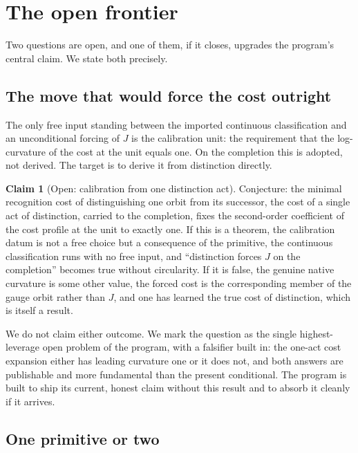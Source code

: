 \documentclass[11pt,a4paper]{article}
\theoremstyle{definition}
\newtheorem{claim}[theorem]{Claim}
\theoremstyle{remark}
\begin{document}
\section{The open frontier}\label{sec:frontier}

Two questions are open, and one of them, if it closes, upgrades the program's
central claim. We state both precisely.

\subsection{The move that would force the cost outright}

The only free input standing between the imported continuous classification and an
unconditional forcing of $J$ is the calibration unit: the requirement that the
log-curvature of the cost at the unit equals one. On the completion this is
adopted, not derived. The target is to derive it from distinction directly.

\begin{claim}[Open: calibration from one distinction act]\label{cl:move1}
Conjecture: the minimal recognition cost of distinguishing one orbit from its
successor, the cost of a single act of distinction, carried to the completion,
fixes the second-order coefficient of the cost profile at the unit to exactly one.
If this is a theorem, the calibration datum is not a free choice but a consequence
of the primitive, the continuous classification runs with no free input, and
``distinction forces $J$ on the completion'' becomes true without circularity. If
it is false, the genuine native curvature is some other value, the forced cost is
the corresponding member of the gauge orbit rather than $J$, and one has learned
the true cost of distinction, which is itself a result.
\end{claim}

We do not claim either outcome. We mark the question as the single
highest-leverage open problem of the program, with a falsifier built in: the
one-act cost expansion either has leading curvature one or it does not, and both
answers are publishable and more fundamental than the present conditional. The
program is built to ship its current, honest claim without this result and to
absorb it cleanly if it arrives.

\subsection{One primitive or two}
\end{document}
